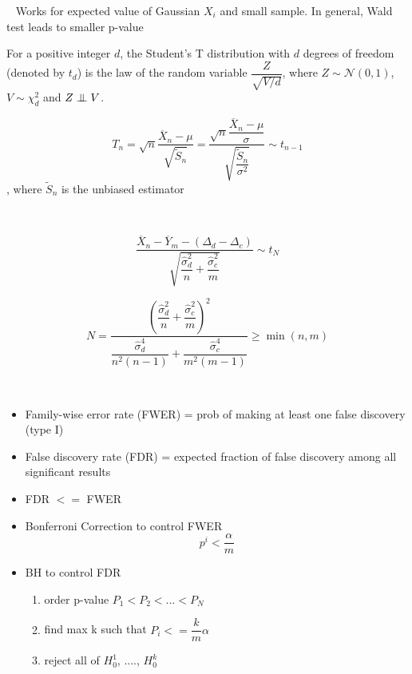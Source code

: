 \documentclass[a4paper, 10pt,landscape]{article}
\newcommand\independent{\protect\mathpalette{\protect\independenT}{\perp}}
\def\independenT#1#2{\mathrel{\setbox0\hbox{$#1#2$}%
    \copy0\kern-\wd0\mkern4mu\box0}}
\begin{document}
\begin{multicols*}{4}
\begin{description}
		\item[On sample T test]~
			Works for expected value of Gaussian $X_i$ and small sample. In general, Wald test leads to smaller p-value		

			For a positive integer $d$, the Student's T distribution with $d$ degrees of freedom (denoted by $t_d$) is the law of the random variable $\dfrac{Z}{\sqrt{V/d}}$, where $Z\sim\mathcal{N}(0,1)$, $V\sim\chi_d^2$ and $Z\independent V$.
			
			\item $$T_n=\sqrt{n}\dfrac{\overline{X}_n - \mu}{\sqrt{\widetilde{S}_n}}=\dfrac{\sqrt{n}\dfrac{\overline{X}_n-\mu}{\sigma}}{\sqrt{\dfrac{\widetilde{S}_n}{\sigma^2}}} \sim t_{n-1}$$, where $\widetilde{S}_n$ is the unbiased estimator

		\item[Two sample T test]~

			$$\dfrac{\overline{X}_n-\overline{Y}_m-\left(\Delta_d-\Delta_c\right)}{\sqrt{\dfrac{\widehat{\sigma}_d^2}{n}+\dfrac{\widehat{\sigma}_c^2}{m}}}\sim t_N$$
			
			$$N=\dfrac{\left(\dfrac{\widehat{\sigma}_d^2}{n}+\dfrac{\widehat{\sigma}_c^2}{m}\right)^2}{\dfrac{\widehat{\sigma}_d^4}{n^2(n-1)}+\dfrac{\widehat{\sigma}_c^4}{m^2(m-1)}}\geq\min(n,m)$$

		\item[Multiple Test]~
			\begin{itemize}
				\item Family-wise error rate (FWER) = prob of making at least one false discovery (type I)
				\item False discovery rate (FDR) = expected fraction of false discovery among all significant results
				\item FDR $<=$ FWER
				\item Bonferroni Correction to control FWER
					$$p^i < \dfrac{\alpha}{m}$$
				\item BH to control FDR
					\begin{enumerate}
						\item order p-value $P_1 < P_2 < ... < P_N$
						\item find max k such that $P_i <= \dfrac{k}{m} \alpha$
						\item reject all of $H_0^1$, ...., $H_0^k$
					\end{enumerate}
			\end{itemize}
\end{description}		


\end{multicols*}
\end{document}
